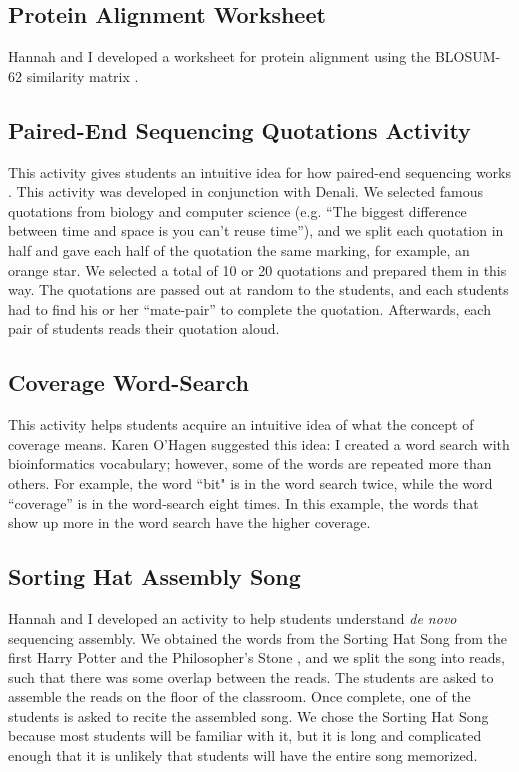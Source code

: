 \documentclass{report}
\begin{document}
\subsection{Protein Alignment Worksheet}
Hannah and I developed a worksheet for protein alignment using the BLOSUM-62 similarity matrix \cite{henikoff1992amino}.

\subsection{Paired-End Sequencing Quotations Activity}
This activity gives students an intuitive idea for how paired-end sequencing works \cite{roach1995pairwise, fleischmann1995whole}. This activity was developed in conjunction with Denali. We selected famous quotations from biology and computer science (e.g. ``The biggest difference between time and space is you can't reuse time''), and we split each quotation in half and gave each half of the quotation the same marking, for example, an orange star. We selected a total of 10 or 20 quotations and prepared them in this way. The quotations are passed out at random to the students, and each students had to find his or her ``mate-pair'' to complete the quotation. Afterwards, each pair of students reads their quotation aloud.

\subsection{Coverage Word-Search}
This activity helps students acquire an intuitive idea of what the concept of coverage means. Karen O'Hagen suggested this idea: I created a word search with bioinformatics vocabulary; however, some of the words are repeated more than others. For example, the word ``bit" is in the word search twice, while the word ``coverage'' is in the word-search eight times. In this example, the words that show up more in the word search have the higher coverage.

\subsection{Sorting Hat Assembly Song}
Hannah and I developed an activity to help students understand \emph{de novo} sequencing assembly. We obtained the words from the Sorting Hat Song from the first Harry Potter and the Philosopher's Stone \cite{rowling1997harry} , and we split the song into reads, such that there was some overlap between the reads. The students are asked to assemble the reads on the floor of the classroom. Once complete,  one of the students is asked to recite the assembled song. We chose the Sorting Hat Song because most students will be familiar with it, but it is long and complicated enough that it is unlikely that students will have the entire song memorized. 
\end{document}
